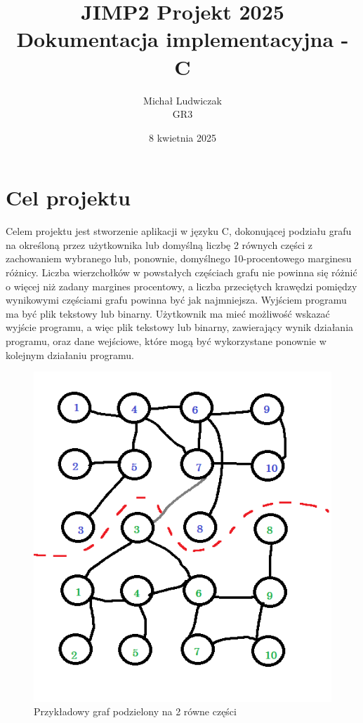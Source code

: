 \documentclass{article}
\title{\Huge JIMP2 Projekt 2025 \\ {\huge Dokumentacja implementacyjna - C}}
\author{Michał Ludwiczak \\ GR3}
\date{8 kwietnia 2025}
\begin{document}
\maketitle

\tableofcontents






\section{Cel projektu}

Celem projektu jest stworzenie aplikacji w języku C, dokonującej podziału grafu na określoną przez użytkownika lub domyślną liczbę 2 równych części z zachowaniem wybranego lub, ponownie, domyślnego 10-procentowego marginesu różnicy. Liczba wierzchołków w powstałych częściach grafu nie powinna się różnić o więcej niż zadany margines procentowy, a liczba przeciętych krawędzi pomiędzy wynikowymi częściami grafu powinna być jak najmniejsza. Wyjściem programu ma być plik tekstowy lub binarny. Użytkownik ma mieć możliwość wskazać wyjście programu, a więc plik tekstowy lub binarny, zawierający wynik działania programu, oraz dane wejściowe, które mogą być wykorzystane ponownie w kolejnym działaniu programu.



\begin{figure}[ht]
    \centering
    \includegraphics[width=0.75\linewidth]{img/graph.png}
    \caption{Przykładowy graf podzielony na 2 równe części}
    \label{fig:graph}
\end{figure}
\end{document}
